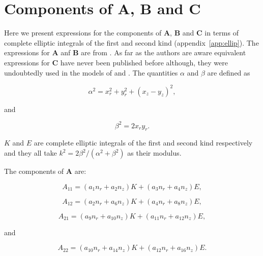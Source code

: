 \documentclass[12pt]{article}
\begin{document}
\section{Components of $\boldsymbol{A}$, $\boldsymbol{B}$ and $\boldsymbol{C}$}
\label{app:mat_A}

Here we present expressions for the components of $\boldsymbol{A}$, $\boldsymbol{B}$ and $\boldsymbol{C}$ in terms of complete elliptic integrals of the first and second kind (appendix~\ref{app:ellip}). The expressions for $\boldsymbol{A}$ anf $\boldsymbol{B}$ are from \citet{Graziani89}. As far as the authors are aware equivalent expressions for $\boldsymbol{C}$ have never been published before although, they were undoubtedly used in the models of \citet{Lee82, Geller86} and \cite{Manga95}. The quantities $\alpha$ and $\beta$ are defined as \citep{Manga94}

\begin{equation}
\label{equ:alpha_def}
\alpha^{2} = x_{r}^{2} + y_{r}^{2} + (x_{z} - y_{z})^{2},
\end{equation}

and 

\begin{equation}
\label{equ:beta_def}
\beta^{2} = 2 x_{r} y_{r}.
\end{equation}


$K$ and $E$ are complete elliptic integrals of the first and second kind respectively and they all take $k^{2} = 2 \beta^{2} / (\alpha^{2} + \beta^{2})$ as their modulus. 

The components of $\boldsymbol{A}$ are:

\begin{equation}
\label{equ:A11_comp}
A_{11} = (a_{1} n_{r} + a_{2} n_{z})K + (a_{3} n_{r} + a_{4} n_{z})E,
\end{equation}

\begin{equation}
\label{equ:A12_comp}
A_{12} = (a_{2} n_{r} + a_{6} n_{z})K + (a_{4} n_{r} + a_{8} n_{z})E,
\end{equation}

\begin{equation}
\label{equ:A21_comp}
A_{21} = (a_{9} n_{r} + a_{10} n_{z})K + (a_{11} n_{r} + a_{12} n_{z})E,
\end{equation}

and 

\begin{equation}
\label{equ:A22_comp}
A_{22} = (a_{10} n_{r} + a_{14} n_{z})K + (a_{12} n_{r} + a_{16} n_{z})E.
\end{equation}
\end{document}
